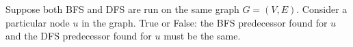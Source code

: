 \begin{prob}
    Suppose both BFS and DFS are run on the same graph $G = (V, E)$. Consider a particular
    node $u$ in the graph. True or False: the BFS predecessor found for $u$
    and the DFS predecessor found for $u$ must be the same.

    \tF{}

\end{prob}
